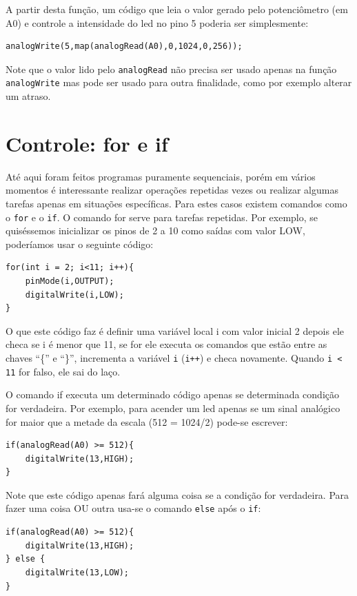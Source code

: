 A partir desta função, um código que leia o valor gerado pelo potenciômetro (em A0) e controle a intensidade do led no pino 5 poderia ser simplesmente:
\begin{lstlisting}
analogWrite(5,map(analogRead(A0),0,1024,0,256));
\end{lstlisting}

Note que o valor lido pelo \lstinline|analogRead| não precisa ser usado apenas na função \lstinline|analogWrite| mas pode ser usado para outra finalidade, como por exemplo alterar um atraso.
  
\section{Controle: for e if}
Até aqui foram feitos programas puramente sequenciais, porém em vários momentos é interessante realizar operações repetidas vezes ou realizar algumas tarefas apenas em situações específicas. Para estes casos existem comandos como o \lstinline|for| e o \lstinline|if|.
O comando for serve para tarefas repetidas. Por exemplo, se quiséssemos inicializar os pinos de 2 a 10 como saídas com valor LOW, poderíamos usar o seguinte código:
\begin{lstlisting}
for(int i = 2; i<11; i++){
	pinMode(i,OUTPUT);
	digitalWrite(i,LOW);
}	
\end{lstlisting}
O que este código faz é definir uma variável local i com valor inicial 2 depois ele checa se i é menor que 11, se for ele executa os comandos que estão entre as chaves ``\{'' e ``\}'', incrementa a variável \lstinline|i| (\lstinline|i++|) e checa novamente. Quando \lstinline|i < 11| for falso, ele sai do laço.

O comando if executa um determinado código apenas se determinada condição for verdadeira. Por exemplo, para acender um led apenas se um sinal analógico for maior que a metade da escala (512 = 1024/2)  pode-se escrever:
\begin{lstlisting}
if(analogRead(A0) >= 512){
	digitalWrite(13,HIGH);
}
\end{lstlisting}

Note que este código apenas fará alguma coisa se a condição for verdadeira. Para fazer uma coisa OU outra usa-se o comando \lstinline|else| após o \lstinline|if|:
\begin{lstlisting}
if(analogRead(A0) >= 512){
	digitalWrite(13,HIGH);
} else {
	digitalWrite(13,LOW);
}
\end{lstlisting}
